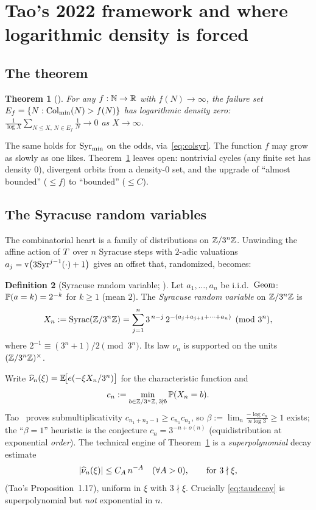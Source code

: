 \documentclass[11pt]{amsart}
\newtheorem{theorem}{Theorem}[section]
\theoremstyle{definition}
\newtheorem{definition}[theorem]{Definition}
\theoremstyle{remark}
\begin{document}
\section{Tao's 2022 framework and where logarithmic density is forced}
\label{sec:tao}

\subsection{The theorem}
\begin{theorem}[\citealp{tao2022}]\label{thm:tao}
For any $f:\mathbb{N}\to\mathbb{R}$ with $f(N)\to\infty$, the failure set
$E_f=\{N:\mathrm{Col}_{\min}(N)>f(N)\}$ has logarithmic density zero:
$\displaystyle \frac{1}{\log X}\sum_{N\le X,\,N\in E_f}\frac1N \to 0$ as $X\to\infty$.
\end{theorem}
The same holds for $\mathrm{Syr}_{\min}$ on the odds, via~\eqref{eq:colsyr}. The function $f$ may grow as slowly
as one likes. Theorem~\ref{thm:tao} leaves open: nontrivial cycles (any finite set has density $0$),
divergent orbits from a density-$0$ set, and the upgrade of ``almost bounded'' ($\le f$) to
``bounded'' ($\le C$).

\subsection{The Syracuse random variables}
The combinatorial heart is a family of distributions on $\mathbb{Z}/3^{n}\mathbb{Z}$. Unwinding the affine action of
$T$ over $n$ Syracuse steps with $2$-adic valuations $a_j=\operatorname{v}\!\big(3\mathrm{Syr}^{j-1}(\cdot)+1\big)$ gives
an offset that, randomized, becomes:

\begin{definition}[Syracuse random variable; \citealp{tao2022,tao2020blog}]\label{def:syrac}
Let $a_1,\dots,a_n$ be i.i.d.\ $\operatorname{Geom}$: $\mathbb{P}(a=k)=2^{-k}$ for $k\ge1$ (mean $2$). The
\emph{Syracuse random variable} on $\mathbb{Z}/3^{n}\mathbb{Z}$ is
\begin{equation}
  X_n := \mathrm{Syrac}(\mathbb{Z}/3^{n}\mathbb{Z}) = \sum_{j=1}^n 3^{\,n-j}\, 2^{-(a_j+a_{j+1}+\cdots+a_n)} \pmod{3^n},
  \label{eq:syrac}
\end{equation}
where $2^{-1}\equiv (3^n+1)/2 \pmod{3^n}$. Its law $\nu_n$ is supported on the units $(\mathbb{Z}/3^{n}\mathbb{Z})^{\times}$.
\end{definition}

Write $\widehat{\nu}_{n}(\xi)=\mathbb{E}\!\big[e(-\xi X_n/3^n)\big]$ for the characteristic function and
\[
   c_n := \min_{b\in\mathbb{Z}/3^{n}\mathbb{Z},\,3\nmid b}\mathbb{P}(X_n=b).
\]
Tao~\citep{tao2020blog} proves submultiplicativity $c_{n_1+n_2-1}\ge c_{n_1}c_{n_2}$, so
$\beta:=\lim_n \tfrac{-\log c_n}{n\log 3}\ge 1$ exists; the ``$\beta=1$'' heuristic is the conjecture
$c_n=3^{-n+o(n)}$ (equidistribution at exponential \emph{order}). The technical engine of
Theorem~\ref{thm:tao} is a \emph{superpolynomial} decay estimate
\begin{equation}
  |\widehat{\nu}_{n}(\xi)| \le C_A\, n^{-A}\quad(\forall A>0),\qquad \text{for } 3\nmid\xi,
  \label{eq:taudecay}
\end{equation}
(Tao's Proposition~1.17), uniform in $\xi$ with $3\nmid\xi$. Crucially \eqref{eq:taudecay} is
superpolynomial but \emph{not} exponential in $n$.
\end{document}
